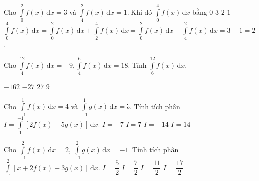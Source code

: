 \begin{ex}%
	Cho $\displaystyle\int\limits_{0}^{2} f(x) \mathrm{\,d}x=3$ và $\displaystyle\int\limits_{4}^{2} f(x) \mathrm{\,d}x=1$. Khi đó $\displaystyle\int\limits_{0}^{4} f(x) \mathrm{\,d}x$ bằng
	\choice
	{$0$}
	{$3$}
	{\True $2$}
	{$1$}
	\loigiai
	{
		$\displaystyle\int\limits_{0}^{4} f(x) \mathrm{\,d}x=\displaystyle\int\limits_{0}^{2} f(x) \mathrm{\,d}x+\displaystyle\int\limits_{2}^{4} f(x) \mathrm{\,d}x=\displaystyle\int\limits_{0}^{2} f(x) \mathrm{\,d}x-\displaystyle\int\limits_{4}^{2} f(x) \mathrm{\,d}x=3-1=2$.
	}
\end{ex}

\begin{ex}
	Cho $  \displaystyle\int\limits_{4}^{12} {f(x)\mathrm{\,d}x}=-9,  \displaystyle\int\limits_{4}^{6} {f(x)\mathrm{\,d}x}=18$. Tính $  \displaystyle\int\limits_{6}^{12} {f(x)\mathrm{\,d}x}$.
	
	\choice
	{ $ {-162}$ }
	{ \True $ {-27}$ }
	{ $ {27}$ }
	{ $ {9}$ }
	\end{ex}

\begin{ex}%
	Cho $\displaystyle\int\limits_{-1}^1 f(x)\mathrm{\,d}x=4$ và $\displaystyle\int\limits_{-1}^1 g(x)\mathrm{\,d}x=3$.
	Tính tích phân $I=\displaystyle\int\limits_1^{-1} [2f(x)-5g(x)]\mathrm{\,d}x$.
	\choice
	{$I=-7$}
	{\True $I=7$}
	{$I=-14$}
	{$I=14$}
\end{ex}

\begin{ex}%
	Cho $\displaystyle\int\limits_{-1}^2 f(x) \mathrm{\,d}x= 2$, $\displaystyle\int\limits_{-1}^2 g(x) \mathrm{\,d}x= -1$. Tính tích phân $\displaystyle\int\limits_{-1}^2 [x + 2f(x) - 3g(x)] \mathrm{\,d}x$.
	\choice
	{$I = \dfrac{5}{2}$}
	{$I = \dfrac{7}{2}$}
	{$I = \dfrac{11}{2}$}
	{\True $I = \dfrac{17}{2}$}
\end{ex}

